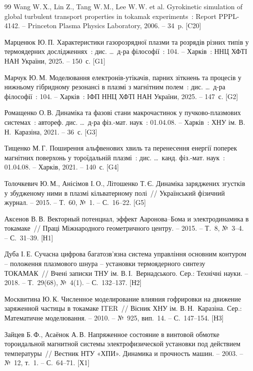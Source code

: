 \documentclass[11pt,a4paper]{article}
\begin{document}
\begin{thebibliography}{99}
 Wang W.\,X., Lin Z., Tang W.\,M., Lee W.\,W. et al. Gyrokinetic
  simulation of global turbulent transport properties in tokamak experiments~: Report
  PPPL-4142. -- Princeton Plasma Physics Laboratory, 2006. -- 34~p. [C20]

 Марценюк Ю.\,П. Характеристики газорозрядної плазми та
  розрядів різних типів у термоядерних дослідженнях~: дис. \ldots\ д-ра філософії~:
  104. -- Харків~: ННЦ ХФТІ НАН України, 2025. -- 150~с. [G1]

 Марчук Ю.\,М. Моделювання електронів-утікачів, парних зіткнень
  та процесів у нижньому гібридному резонансі в плазмі з магнітним полем~: дис.
  \ldots\ д-ра філософії~: 104. -- Харків~: ІФП ННЦ ХФТІ НАН України, 2025. --
  147~с. [G2]

 Ромащенко О.\,В. Динаміка та фазові стани макрочастинок у
  пучково-плазмових системах~: автореф. дис. \ldots\ д-ра фіз.-мат. наук~: 01.04.08.
  -- Харків~: ХНУ ім. В.\,Н.~Каразіна, 2021. -- 36~с. [G3]

 Тищенко М.\,Г. Поширення альфвенових хвиль та перенесення
  енергії поперек магнітних поверхонь у тороїдальній плазмі~: дис. \ldots\ канд.
  фіз.-мат. наук~: 01.04.08. -- Харків, 2021. -- 140~с. [G4]

 Толочкевич Ю.\,М., Анісімов І.\,О., Літошенко Т.\,Є.
  Динаміка заряджених згустків у збудженому ними в плазмі кільватерному полі~//
  Український фізичний журнал. -- 2015. -- Т.~60, №~1. -- С.~16--22. [G5]

 Аксенов В.\,В. Векторный потенциал, эффект Ааронова--Бома и
  электродинамика в токамаке~// Праці Міжнародного геометричного центру. -- 2015. --
  Т.~8, №~3--4. -- С.~31--39. [Н1]

 Дуба І.\,Е. Сучасна цифрова багатозв'язна система управління
  основним контуром -- положення плазмового шнура -- установки термоядерного синтезу
  ТОКАМАК~// Вчені записки ТНУ ім. В.\,І.~Вернадського. Сер.: Технічні науки. --
  2018. -- Т.~29(68), №~4(1). -- С.~132--137. [Н2]

 Москвитина Ю.\,К. Численное моделирование влияния
  гофрировки на движение заряженной частицы в токамаке ITER~// Вісник ХНУ ім.
  В.\,Н.~Каразіна. Сер.: Математичне моделювання. -- 2010. -- №~925, вип.~14. --
  С.~147--154. [Н3]

 Зайцев Б.\,Ф., Асаёнок А.\,В. Напряженное состояние в винтовой
  обмотке тороидальной магнитной системы электрофизической установки под действием
  температуры~// Вестник НТУ «ХПИ». Динамика и прочность машин. -- 2003. -- №~12,
  т.~1. -- С.~64--71. [Х1]


\end{thebibliography}
\end{document}
